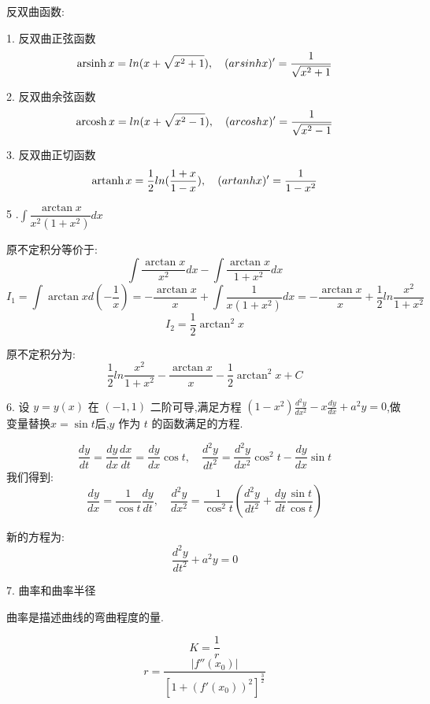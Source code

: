 \begin{definition}
	反双曲函数:  
	
	1. 反双曲正弦函数
	$$\operatorname{arsinh} x=ln(x+\sqrt{x^2+1}),\quad (arsinh x)'=\frac{1}{\sqrt{x^2+1}}$$
	
	2. 反双曲余弦函数
	$$\operatorname{arcosh} x=ln(x+\sqrt{x^2-1}),\quad (arcosh x)'=\frac{1}{\sqrt{x^2-1}}$$
	
	3. 反双曲正切函数
	$$\operatorname{artanh} x=\frac{1}{2}ln(\frac{1+x}{1-x}),\quad (artanh x)'=\frac{1}{1-x^2}$$
\end{definition}
5 .$\int\dfrac{\arctan x}{x^2(1+x^2)}dx$
\begin{solution}
	
	原不定积分等价于:  
	$$\int\dfrac{\arctan x}{x^2}dx-\int\frac{\arctan x}{1+x^2}dx$$
	$$I_{1}=\int\arctan xd(-\frac{1}{x})=-\frac{\arctan x}{x}+\int\frac{1}{x(1+x^2)}dx=-\frac{\arctan x}{x}+\frac{1}{2}ln\frac{x^2}{1+x^2}$$
	$$I_{2}=\frac{1}{2}\arctan^{2}x$$
	
	原不定积分为:  $$\frac{1}{2}ln\frac{x^2}{1+x^2}-\frac{\arctan x}{x}-\frac{1}{2}\arctan^{2}x+C$$
\end{solution}
6. 设 $y=y(x)$ 在 $(-1,1)$ 二阶可导,满足方程 $(1-x^2)\frac{d^2 y}{d x^2}-x\frac{dy}{dx}+a^2y=0$,做变量替换$x=\sin t$后,$y$ 作为 $t$ 的函数满足的方程.
\begin{solution}
	
	$$\frac{dy}{dt}=\frac{dy}{dx}\frac{dx}{dt}=\frac{dy}{dx}\cos t,\quad \frac{d^2y}{dt^2}=\frac{d^2y}{dx^2}\cos^2 t-\frac{dy}{dx}\sin t $$
	我们得到:  
	$$\frac{dy}{dx}=\frac{1}{\cos t}\frac{dy}{dt},\quad \frac{d^2y}{dx^2}=\frac{1}{\cos^2 t}(\frac{d^2y}{dt^2}+\frac{dy}{dt}\frac{\sin t}{\cos t})$$
	
	新的方程为:  
	$$\frac{d^2y}{dt^2}+a^2y=0$$
\end{solution}

7. 曲率和曲率半径
\begin{definition}
	曲率是描述曲线的弯曲程度的量.
	
	$$K=\dfrac{1}{r}$$
	$$r=\dfrac{|f''(x_{0})|}{[1+(f'(x_{0}))^{2}]^{\frac{3}{2}}}$$
	
\end{definition}

